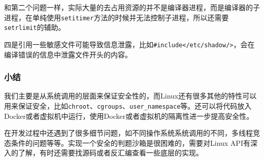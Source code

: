 和第二个问题一样，实际大量的去占用资源的并不是编译器进程，而是编译器的子进程，在单纯使用\texttt{setitimer}方法的时候并无法控制子进程，所以还需要\texttt{setrlimit}的辅助。

四是引用一些敏感文件可能导致信息泄露，比如\texttt{\#include</etc/shadow/>}，会在编译错误的信息中泄露文件开头的内容。

\subsubsection{小结}
我们主要是从系统调用的层面来保证安全性的，而Linux还有很多其他的特性可以用来保证安全，比如\texttt{chroot}、\texttt{cgroups}、\texttt{user\_namespace}等。还可以将代码放入Docker或者虚拟机中运行，使用Docker或者虚拟机的隔离性进一步提高安全性。

在开发过程中还遇到了很多细节问题，如不同操作系统系统调用的不同，多线程竞态条件的问题等等。实现一个安全的判题沙箱是很困难的，需要对Linux API有深入的了解，有时还需要找源码或者反汇编查看一些底层的实现。
